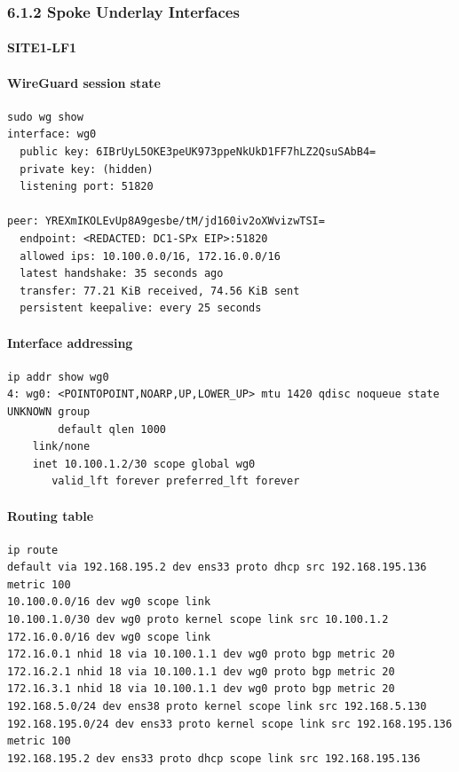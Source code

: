 \documentclass[11pt]{article}
\begin{document}
\subsubsection{6.1.2 Spoke Underlay Interfaces}
\label{sec:spoke-underlay-interfaces}

\paragraph{SITE1-LF1}

\paragraph{WireGuard session state}

\begin{verbatim}
sudo wg show
interface: wg0
  public key: 6IBrUyL5OKE3peUK973ppeNkUkD1FF7hLZ2QsuSAbB4=
  private key: (hidden)
  listening port: 51820

peer: YREXmIKOLEvUp8A9gesbe/tM/jd160iv2oXWvizwTSI=
  endpoint: <REDACTED: DC1-SPx EIP>:51820
  allowed ips: 10.100.0.0/16, 172.16.0.0/16
  latest handshake: 35 seconds ago
  transfer: 77.21 KiB received, 74.56 KiB sent
  persistent keepalive: every 25 seconds
\end{verbatim}

\paragraph{Interface addressing}

\begin{verbatim}
ip addr show wg0
4: wg0: <POINTOPOINT,NOARP,UP,LOWER_UP> mtu 1420 qdisc noqueue state UNKNOWN group
        default qlen 1000
    link/none
    inet 10.100.1.2/30 scope global wg0
       valid_lft forever preferred_lft forever
\end{verbatim}

\paragraph{Routing table}

\begin{verbatim}
ip route
default via 192.168.195.2 dev ens33 proto dhcp src 192.168.195.136 metric 100
10.100.0.0/16 dev wg0 scope link
10.100.1.0/30 dev wg0 proto kernel scope link src 10.100.1.2
172.16.0.0/16 dev wg0 scope link
172.16.0.1 nhid 18 via 10.100.1.1 dev wg0 proto bgp metric 20
172.16.2.1 nhid 18 via 10.100.1.1 dev wg0 proto bgp metric 20
172.16.3.1 nhid 18 via 10.100.1.1 dev wg0 proto bgp metric 20
192.168.5.0/24 dev ens38 proto kernel scope link src 192.168.5.130
192.168.195.0/24 dev ens33 proto kernel scope link src 192.168.195.136 metric 100
192.168.195.2 dev ens33 proto dhcp scope link src 192.168.195.136
\end{verbatim}
\end{document}
